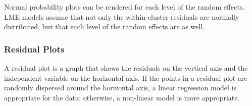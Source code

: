 \documentclass[12pt, a4paper]{report}
\theoremstyle{plain}
\theoremstyle{definition}
\theoremstyle{remark}
\begin{document}
	
	
	Normal probability plots can be rendered for each level of the random effects.  LME models assume that not only the within-cluster residuals are normally distributed, but that each level of the random effects are as well. %
	
	
	
	
	
	
	
	
	
	
	
	
	
	
	
	
	
	\subsubsection{Residual Plots}
	A residual plot is a graph that shows the residuals on the vertical axis and the independent variable on the horizontal axis. If the points in a residual plot are randomly dispersed around the horizontal axis, a linear regression model is appropriate for the data; otherwise, a non-linear model is more appropriate.
	
	
\end{document}

